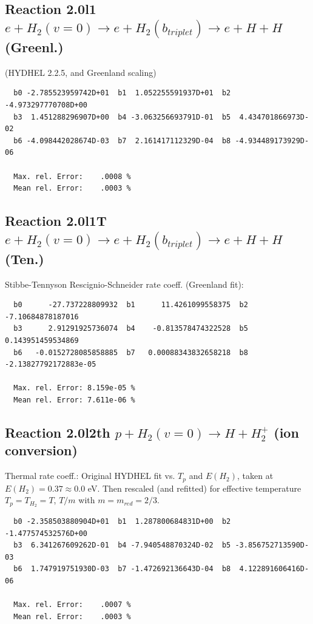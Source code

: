 \documentclass[12pt,dvipdfmx]{article}
\begin{document}
\subsection{
Reaction 2.0l1
$ e + H_2(v=0) \rightarrow e+ H_2(b_{triplet})\rightarrow e +  H + H $ (Greenl.)
}

(HYDHEL 2.2.5, and Greenland scaling)


\begin{small}\begin{verbatim}
  b0 -2.785523959742D+01  b1  1.052255591937D+01  b2 -4.973297770708D+00
  b3  1.451288296907D+00  b4 -3.063256693791D-01  b5  4.434701866973D-02
  b6 -4.098442028674D-03  b7  2.161417112329D-04  b8 -4.934489173929D-06

  Max. rel. Error:    .0008 %
  Mean rel. Error:    .0003 %
\end{verbatim}\end{small}
\subsection{
Reaction 2.0l1T
$ e +  H_2(v=0) \rightarrow e+ H_2(b_{triplet})\rightarrow e + H + H $ (Ten.)
}
Stibbe-Tennyson Rescignio-Schneider rate coeff. (Greenland fit):

\begin{small}\begin{verbatim}
  b0      -27.737228809932  b1      11.4261099558375  b2     -7.10684878187016
  b3      2.91291925736074  b4    -0.813578474322528  b5     0.143951459534869
  b6   -0.0152728085858885  b7   0.00088343832658218  b8 -2.13827792172883e-05

  Max. rel. Error: 8.159e-05 %
  Mean rel. Error: 7.611e-06 %
\end{verbatim}\end{small}

\subsection{
Reaction 2.0l2th
$ p + H_2(v=0) \rightarrow H + H_2^+$ (ion conversion)
}
Thermal rate coeff.:
Original HYDHEL fit vs. $T_p$ and $E(H_2)$, taken at $E(H_2) = 0.37 \approx 0.0$ eV.
Then rescaled (and refitted) for effective temperature $T_p=T_{H_2}=T$,
$T/m$ with $m=m_{red}=2/3$.

\begin{small}\begin{verbatim}
  b0 -2.358503880904D+01  b1  1.287800684831D+00  b2 -1.477574532576D+00
  b3  6.341267609262D-01  b4 -7.940548870324D-02  b5 -3.856752713590D-03
  b6  1.747919751930D-03  b7 -1.472692136643D-04  b8  4.122891606416D-06

  Max. rel. Error:    .0007 %
  Mean rel. Error:    .0003 %
\end{verbatim}\end{small}
\end{document}
